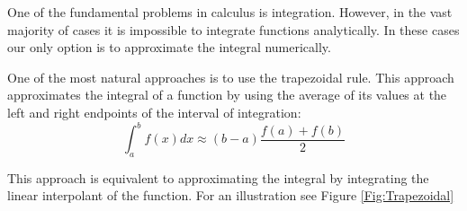 

One of the fundamental problems in calculus is integration. However, in the vast majority of cases it is impossible to integrate functions analytically. In these cases our only option is to approximate the integral numerically.

One of the most natural approaches is to use the trapezoidal rule. This approach approximates the integral of a function by using the average of its values at the left and right endpoints of the interval of integration:
\[
\int_a^b f(x) dx \approx (b-a)\frac{f(a) + f(b)}{2}
\]

This approach is equivalent to approximating the integral by integrating the linear interpolant of the function. For an illustration see Figure \ref{Fig:Trapezoidal}

